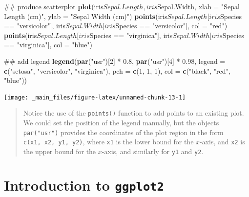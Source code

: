 \documentclass[]{book}
\newenvironment{Shaded}{\begin{snugshade}}{\end{snugshade}}
\newcommand{\KeywordTok}[1]{\textcolor[rgb]{0.13,0.29,0.53}{\textbf{{#1}}}}
\newcommand{\DataTypeTok}[1]{\textcolor[rgb]{0.13,0.29,0.53}{{#1}}}
\newcommand{\DecValTok}[1]{\textcolor[rgb]{0.00,0.00,0.81}{{#1}}}
\newcommand{\FloatTok}[1]{\textcolor[rgb]{0.00,0.00,0.81}{{#1}}}
\newcommand{\StringTok}[1]{\textcolor[rgb]{0.31,0.60,0.02}{{#1}}}
\newcommand{\NormalTok}[1]{{#1}}
\theoremstyle{definition}
\theoremstyle{definition}
\theoremstyle{definition}
\theoremstyle{remark}
\begin{document}
\begin{Shaded}
\begin{Highlighting}[]
\NormalTok{## produce scatterplot}
\KeywordTok{plot}\NormalTok{(iris$Sepal.Length, iris$Sepal.Width, }
     \DataTypeTok{xlab =} \StringTok{"Sepal Length (cm)"}\NormalTok{, }\DataTypeTok{ylab =} \StringTok{"Sepal Width (cm)"}\NormalTok{)}
\KeywordTok{points}\NormalTok{(iris$Sepal.Length[iris$Species ==}\StringTok{ "versicolor"}\NormalTok{],}
       \NormalTok{iris$Sepal.Width[iris$Species ==}\StringTok{ "versicolor"}\NormalTok{], }\DataTypeTok{col =} \StringTok{"red"}\NormalTok{)}
\KeywordTok{points}\NormalTok{(iris$Sepal.Length[iris$Species ==}\StringTok{ "virginica"}\NormalTok{],}
       \NormalTok{iris$Sepal.Width[iris$Species ==}\StringTok{ "virginica"}\NormalTok{], }\DataTypeTok{col =} \StringTok{"blue"}\NormalTok{)}

\NormalTok{## add legend}
\KeywordTok{legend}\NormalTok{(}\KeywordTok{par}\NormalTok{(}\StringTok{"usr"}\NormalTok{)[}\DecValTok{2}\NormalTok{] *}\StringTok{ }\FloatTok{0.8}\NormalTok{, }\KeywordTok{par}\NormalTok{(}\StringTok{"usr"}\NormalTok{)[}\DecValTok{4}\NormalTok{] *}\StringTok{ }\FloatTok{0.98}\NormalTok{, }
       \DataTypeTok{legend =} \KeywordTok{c}\NormalTok{(}\StringTok{"setosa"}\NormalTok{, }\StringTok{"versicolor"}\NormalTok{, }\StringTok{"virginica"}\NormalTok{), }
       \DataTypeTok{pch =} \KeywordTok{c}\NormalTok{(}\DecValTok{1}\NormalTok{, }\DecValTok{1}\NormalTok{, }\DecValTok{1}\NormalTok{), }
       \DataTypeTok{col =} \KeywordTok{c}\NormalTok{(}\StringTok{"black"}\NormalTok{, }\StringTok{"red"}\NormalTok{, }\StringTok{"blue"}\NormalTok{))}
\end{Highlighting}
\end{Shaded}

\begin{center}\texttt{[image: \_main\_files/figure-latex/unnamed-chunk-13-1]} \end{center}

\begin{quote}
Notice the use of the \texttt{points()} function to add points to an
existing plot. We could set the position of the legend manually, but the
objects \texttt{par("usr")} provides the coordinates of the plot region
in the form \texttt{c(x1,\ x2,\ y1,\ y2)}, where \texttt{x1} is the
lower bound for the \(x\)-axis, and \texttt{x2} is the upper bound for
the \(x\)-axis, and similarly for \texttt{y1} and \texttt{y2}.
\end{quote}

\section{\texorpdfstring{Introduction to
\texttt{ggplot2}}{Introduction to ggplot2}}\label{introduction-to-ggplot2}
\end{document}
